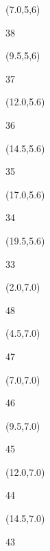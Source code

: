 \documentclass[a4paper]{article}
\newcommand{\myseat}[5]{%
\vspace{-0.1cm} \hspace{-0.5cm}
\parbox[t][2.2cm][t]{3.5cm}{%
\small #1 %
\begin{description}
\vspace{-0.1cm}
\item [ID:] #2
\vspace{-0.1cm}
\item [Team:] #3 \normalsize
\vspace{-0.1cm}
\item \normalsize #4 #5
\vspace{-0.1cm}
\end{description}
}
}
\begin{document}
\begin{CJK}{UTF8}{cyberbit}
\begin{textblock}{2.5}(7.0,5,6)
\textblockcolor{}
\myseat{38}{}{}{}{}
\end{textblock}

\begin{textblock}{2.5}(9.5,5,6)
\textblockcolor{}
\myseat{37}{}{}{}{}
\end{textblock}

\begin{textblock}{2.5}(12.0,5.6)
\textblockcolor{}
\myseat{36}{}{}{}{}
\end{textblock}

\begin{textblock}{2.5}(14.5,5.6)
\textblockcolor{}
\myseat{35}{}{}{}{}
\end{textblock}

\begin{textblock}{2.5}(17.0,5.6)
\textblockcolor{}
\myseat{34}{}{}{}{}
\end{textblock}

\begin{textblock}{2.5}(19.5,5.6)
\textblockcolor{}
\myseat{33}{}{}{}{}
\end{textblock}


\begin{textblock}{2.5}(2.0,7.0)
\textblockcolor{}
\myseat{48}{}{}{}{}
\end{textblock}

\begin{textblock}{2.5}(4.5,7.0)
\textblockcolor{}
\myseat{47}{}{}{}{}
\end{textblock}

\begin{textblock}{2.5}(7.0,7.0)
\textblockcolor{}
\myseat{46}{}{}{}{}
\end{textblock}

\begin{textblock}{2.5}(9.5,7.0)
\textblockcolor{}
\myseat{45}{}{}{}{}
\end{textblock}

\begin{textblock}{2.5}(12.0,7.0)
\textblockcolor{}
\myseat{44}{}{}{}{}
\end{textblock}

\begin{textblock}{2.5}(14.5,7.0)
\textblockcolor{}
\myseat{43}{}{}{}{}
\end{textblock}


\end{CJK}
\end{document}
